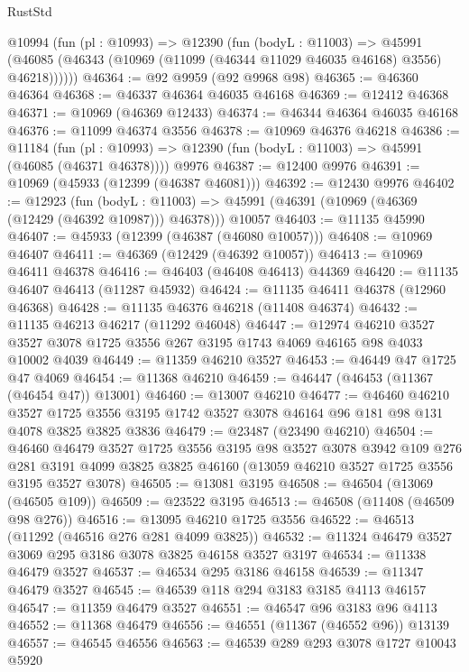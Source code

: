 \begin{lexlean}{RustStd}
\begin{coremodule}
    @10994
      (fun (pl : @10993) =>
      @12390
        (fun (bodyL : @11003) =>
        @45991 (@46085 (@46343 (@10969 (@11099 (@46344 @11029 @46035 @46168) @3556) @46218))))))
@46364 := @92 @9959 (@92 @9968 @98)
@46365 := @46360 @46364
@46368 := @46337 @46364 @46035 @46168
@46369 := @12412 @46368
@46371 := @10969 (@46369 @12433)
@46374 := @46344 @46364 @46035 @46168
@46376 := @11099 @46374 @3556
@46378 := @10969 @46376 @46218
@46386 := @11184
    (fun (pl : @10993) => @12390 (fun (bodyL : @11003) => @45991 (@46085 (@46371 @46378))))
    @9976
@46387 := @12400 @9976
@46391 := @10969 (@45933 (@12399 (@46387 @46081)))
@46392 := @12430 @9976
@46402 := @12923
    (fun (bodyL : @11003) => @45991 (@46391 (@10969 (@46369 (@12429 (@46392 @10987))) @46378)))
    @10057
@46403 := @11135 @45990
@46407 := @45933 (@12399 (@46387 (@46080 @10057)))
@46408 := @10969 @46407
@46411 := @46369 (@12429 (@46392 @10057))
@46413 := @10969 @46411 @46378
@46416 := @46403 (@46408 @46413) @44369
@46420 := @11135 @46407 @46413 (@11287 @45932)
@46424 := @11135 @46411 @46378 (@12960 @46368)
@46428 := @11135 @46376 @46218 (@11408 @46374)
@46432 := @11135 @46213 @46217 (@11292 @46048)
@46447 := @12974
    @46210
    @3527
    @3527
    @3078
    @1725
    @3556
    @267
    @3195
    @1743
    @4069
    @46165
    @98
    @4033
    @10002
    @4039
@46449 := @11359 @46210 @3527
@46453 := @46449 @47 @1725 @47 @4069
@46454 := @11368 @46210
@46459 := @46447 (@46453 (@11367 (@46454 @47)) @13001)
@46460 := @13007 @46210
@46477 := @46460
    @46210
    @3527
    @1725
    @3556
    @3195
    @1742
    @3527
    @3078
    @46164
    @96
    @181
    @98
    @131
    @4078
    @3825
    @3825
    @3836
@46479 := @23487 (@23490 @46210)
@46504 := @46460
    @46479
    @3527
    @1725
    @3556
    @3195
    @98
    @3527
    @3078
    @3942
    @109
    @276
    @281
    @3191
    @4099
    @3825
    @3825
    @46160
    (@13059 @46210 @3527 @1725 @3556 @3195 @3527 @3078)
@46505 := @13081 @3195
@46508 := @46504 (@13069 (@46505 @109))
@46509 := @23522 @3195
@46513 := @46508 (@11408 (@46509 @98 @276))
@46516 := @13095 @46210 @1725 @3556
@46522 := @46513 (@11292 (@46516 @276 @281 @4099 @3825))
@46532 := @11324 @46479 @3527 @3069 @295 @3186 @3078 @3825 @46158 @3527 @3197
@46534 := @11338 @46479 @3527
@46537 := @46534 @295 @3186 @46158
@46539 := @11347 @46479 @3527
@46545 := @46539 @118 @294 @3183 @3185 @4113 @46157
@46547 := @11359 @46479 @3527
@46551 := @46547 @96 @3183 @96 @4113
@46552 := @11368 @46479
@46556 := @46551 (@11367 (@46552 @96)) @13139
@46557 := @46545 @46556
@46563 := @46539 @289 @293 @3078 @1727 @10043 @5920

\end{coremodule}
\end{lexlean}
